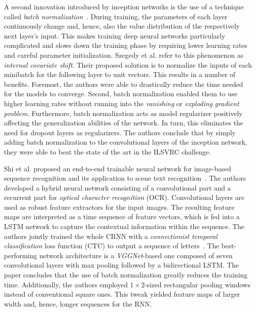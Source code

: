 A second innovation introduced by inception networks is the use of a technique called \emph{batch normalization}~\cite{ioffe2015batch}. During training, the parameters of each layer continuously change and, hence, also the value distribution of the respectively next layer's input. This makes training deep neural networks particularly complicated and slows down the training phase by requiring lower learning rates and careful parameter initialization. Szegedy et al. refer to this phenomenon as \emph{internal covariate shift}. Their proposed solution is to normalize the inputs of each minibatch for the following layer to unit vectors. This results in a number of benefits. Foremost, the authors were able to drastically reduce the time needed for the models to converge. Second, batch normalization enabled them to use higher learning rates without running into the \emph{vanishing} or \emph{exploding gradient problem}. Furthermore, batch normalization acts as model regularizer positively affecting the generalization abilities of the network. In turn, this eliminates the need for dropout layers as regularizers. The authors conclude that by simply adding batch normalization to the convolutional layers of the inception network, they were able to beat the state of the art in the ILSVRC challenge.

Shi et al. proposed an end-to-end trainable neural network for image-based sequence recognition and its application to scene text recognition~\cite{shi2016end}. The authors developed a hybrid neural network consisting of a convolutional part and a recurrent part for \emph{optical character recognition} (OCR). Convolutional layers are used as robust feature extractors for the input images. The resulting feature maps are interpreted as a time sequence of feature vectors, which is fed into a LSTM network to capture the contextual information within the sequence. The authors jointly trained the whole CRNN with a \emph{connectionist temporal classification} loss function (CTC) to output a sequence of letters~\cite{graves2006connectionist}. The best-performing network architecture is a \emph{VGGNet}-based one composed of seven convolutional layers with max pooling followed by a bidirectional LSTM. The paper concludes that the use of batch normalization greatly reduces the training time. Additionally, the authors employed $1 \times 2$-sized rectangular pooling windows instead of conventional square ones. This tweak yielded feature maps of larger width and, hence, longer sequences for the RNN.


